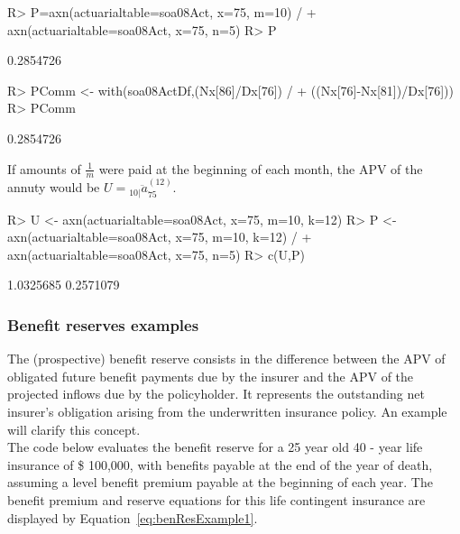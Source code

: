 \documentclass[nojss]{jss}
\begin{document}
\begin{Schunk}
\begin{Sinput}
R> P=axn(actuarialtable=soa08Act, x=75, m=10) / 
+  		axn(actuarialtable=soa08Act, x=75, n=5)
R> P
\end{Sinput}
\begin{Soutput}
[1] 0.2854726
\end{Soutput}
\begin{Sinput}
R> PComm <- with(soa08ActDf,(Nx[86]/Dx[76]) / 
+  				((Nx[76]-Nx[81])/Dx[76]))
R> PComm
\end{Sinput}
\begin{Soutput}
[1] 0.2854726
\end{Soutput}
\end{Schunk}

If amounts of $\frac{1}{m}$ were paid at the beginning of each month,  the
APV of the annuty would be $U={}_{10|}\ddot{a}_{75}^{(12)}$.




\begin{Schunk}
\begin{Sinput}
R> U <- axn(actuarialtable=soa08Act, x=75, m=10, k=12)
R> P <- axn(actuarialtable=soa08Act, x=75, m=10, k=12) / 
+  		axn(actuarialtable=soa08Act, x=75, n=5)
R> c(U,P)
\end{Sinput}
\begin{Soutput}
[1] 1.0325685 0.2571079
\end{Soutput}
\end{Schunk}




\subsubsection{Benefit reserves examples}\label{sss:benefitReserves}

The (prospective) benefit reserve consists in the difference between the APV of obligated
future benefit payments due by the insurer and the APV of the projected
inflows due by the policyholder. It represents
the outstanding net insurer's obligation arising from the
underwritten insurance policy.
An example will clarify this concept.\\ The code below evaluates the
benefit reserve for a 25 year old 40 - year life insurance of \$ 100,000, with
benefits payable at the end of the year of death, assuming a level benefit premium
payable at the beginning of each year.
The benefit premium and reserve equations for this life contingent insurance are
displayed by Equation~\ref{eq:benResExample1}.
\end{document}
